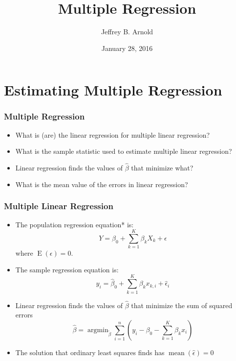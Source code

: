 \documentclass{beamer}
\title{Multiple Regression}
\author{Jeffrey B. Arnold}
\date{January 28, 2016}
\DeclareMathOperator{\mean}{mean}
\DeclareMathOperator{\E}{E}
\DeclareMathOperator{\argmin}{argmin}
\begin{document}


\begin{frame}
  \maketitle{}
\end{frame}

\section{Estimating Multiple Regression}

\begin{frame}
  \frametitle{Multiple Regression}
  
  \begin{itemize}
  \item What is (are) the linear regression for multiple linear regression?
  \item What is the sample statistic used to estimate multiple linear regression?
  \item Linear regression finds the values of $\hat\beta$ that minimize what?
  \item What is the mean value of the errors in linear regression? 
  \end{itemize}

\end{frame}

\begin{frame}
  \frametitle{Multiple Linear Regression}
  
  \begin{itemize}
  \item The population regression equation* is:
  \begin{equation*}
  Y = \beta_0 + \sum_{k = 1}^{K} \beta_k X_k + \epsilon
  \end{equation*}
  where $\E(\epsilon) = 0$.
  \item The sample regression equation is:
  \begin{equation*}
  y_i = \hat\beta_0 + \sum_{k = 1}^K  \beta_k x_{k, i} + \hat\epsilon_i
  \end{equation*}
  \item Linear regression finds the values of $\hat\beta$ that minimize the sum of squared errors
  \begin{equation*}
  \hat\beta = \argmin_{\tilde\beta} \sum_{i = 1}^n (y_i - \beta_0 - \sum_{k = 1}^K \beta_k x_i)
  \end{equation*}
  \item The solution that ordinary least squares finds has $\mean(\hat\epsilon) = 0$
  \end{itemize}
  
\end{frame}
\end{document}
